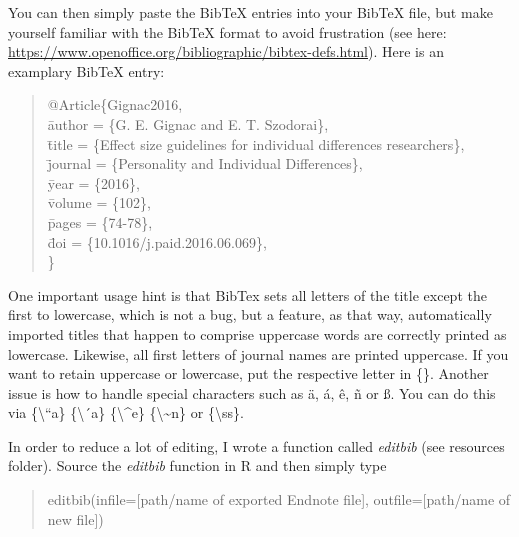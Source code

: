 \documentclass[
]{article}
\begin{document}
You can then simply paste the BibTeX entries into your BibTeX file, but
make yourself familiar with the BibTeX format to avoid frustration (see
here: \url{https://www.openoffice.org/bibliographic/bibtex-defs.html}).
Here is an examplary BibTeX entry:

\begin{quote}
\begin{tabbing}
@Article\{Gignac2016,\\
\hspace{1em} \= author = \{G. E. Gignac  and E. T. Szodorai\},\\
\hspace{1em} \= title = \{Effect size guidelines for individual differences researchers\},\\
\hspace{1em} \= journal = \{Personality and Individual Differences\},\\
\hspace{1em} \= year = \{2016\},\\
\hspace{1em} \= volume = \{102\},\\
\hspace{1em} \= pages = \{74-78\},\\
\hspace{1em} \= doi = \{10.1016/j.paid.2016.06.069\},\\
\}
\end{tabbing}
\end{quote}

One important usage hint is that BibTex sets all letters of the title
except the first to lowercase, which is not a bug, but a feature, as
that way, automatically imported titles that happen to comprise
uppercase words are correctly printed as lowercase. Likewise, all first
letters of journal names are printed uppercase. If you want to retain
uppercase or lowercase, put the respective letter in \{\}. Another issue
is how to handle special characters such as ä, á, ê, ñ or ß. You can do
this via \{\textbackslash``a\} \{\textbackslash´a\}
\{\textbackslash\^{}e\} \{\textbackslash\textasciitilde n\} or
\{\textbackslash ss\}.

In order to reduce a lot of editing, I wrote a function called
\emph{editbib} (see resources folder). Source the \emph{editbib}
function in R and then simply type

\begin{quote}
editbib(infile=[path/name of exported Endnote file], outfile=[path/name of new file])
\end{quote}
\end{document}
